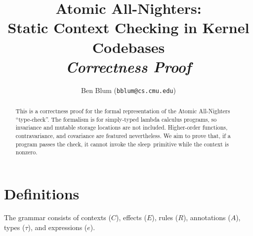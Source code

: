 \documentclass{article}
\begin{document}
\captionsetup{width=.75\textwidth,font=small,labelfont=bf}
\title{{\bf Atomic All-Nighters: \\ Static Context Checking in Kernel Codebases} \\ {\em Correctness Proof}}
\author{Ben Blum (\texttt{bblum@cs.cmu.edu})}
\maketitle

\newcommand\true{\;\textit{true}}
\newcommand\false{\;\textit{false}}

\newcommand\alpher\alpha
\newcommand\beter\beta
\newcommand\gammer\gamma
\newcommand\delter\delta
\newcommand\zeter\zeta
\newcommand\Sigmer\Sigma

\newcommand\NN{\mathbb{N}}
\newcommand\QQ{\mathbb{Q}}
\newcommand\RR{\mathbb{R}}
\newcommand\ZZ{\mathbb{Z}}

\newcommand\Infinity{ {\sf Infinity}}
\newcommand{\Nested}[1]{ {\sf Nested}~ #1}
\newcommand{\IncDec}[1]{ {\sf IncDec}~ #1}
\newcommand\Enable{ {\sf Enable}}
\newcommand\Disable{ {\sf Disable}}
\newcommand\inc{ {\sf inc}}
\newcommand\dec{ {\sf dec}}

\newcommand\sleep{{\sf sleep}}
\newcommand\unit{{1}}

\begin{abstract}
This is a correctness proof for the formal representation of the Atomic All-Nighters ``type-check''.
The formalism is for simply-typed lambda calculus programs, so invariance and mutable storage locations are not included. Higher-order functions, contravariance, and covariance are featured nevertheless.
We aim to prove that, if a program passes the check, it cannot invoke the \sleep~primitive while the context is nonzero.
\end{abstract}


\section{Definitions}

The grammar consists of contexts ($C$), effects ($E$), rules ($R$), annotations ($A$), types ($\tau$),
and expressions ($e$).

\newcommand\expr{\ensuremath{\mathsf{e}}}
\newcommand\stmt{\ensuremath{\mathsf{st}}}
\newcommand\decl{\ensuremath{\mathsf{decl}}}
\newcommand\fn{\ensuremath{\mathsf{fn}}}
\newcommand\lv{\ensuremath{\mathsf{lv}}}
\newcommand\prog{\ensuremath{\mathcal{P}}}
\newcommand\fnname{\ensuremath{f}}
\newcommand\varname{\ensuremath{x}}
\newcommand\addr{\ensuremath{\&}}
\newcommand\rep[1]{\ensuremath{\overline{#1}}}
\newcommand\return{\ensuremath{\mathsf{return}}}
\newcommand\ctx[2]{\ensuremath{#1@#2}}
\end{document}
